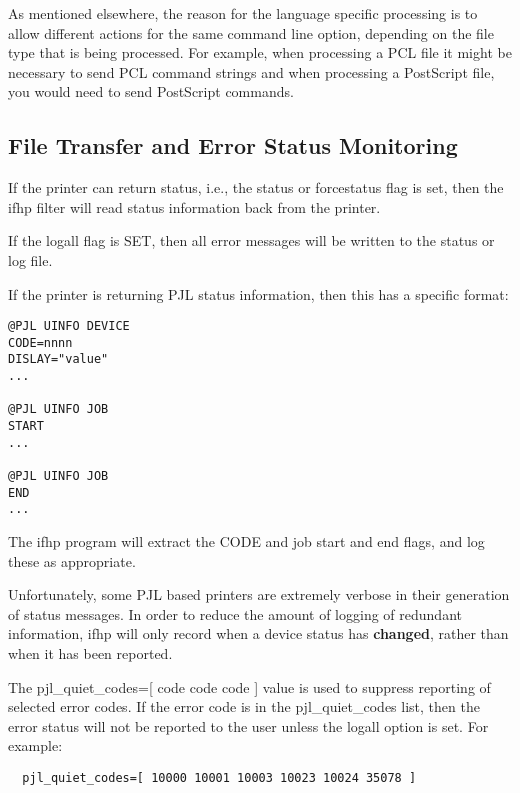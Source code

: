 \documentclass[a4paper]{article}
\begin{document}
As mentioned elsewhere,
the reason for the language specific processing is to allow
different actions for the same command line option,
depending on the file type that is being processed.
For example,  when processing a PCL file it might be necessary to send
PCL command strings and when processing a PostScript file,
you would need to send PostScript commands.


\subsection{File Transfer and Error Status Monitoring
\label{filetransfer}
\label{logall}
\label{pjl_error_codes}
\label{pjl_quiet_codes}}

If the printer can return status, i.e., the
{\ttfamily status}
or 
{\ttfamily forcestatus}
flag is set,
then the
{\ttfamily ifhp}
filter will read status information back from the printer.

If the
{\ttfamily logall}
flag is SET,
then all error messages will be written to the status or log file.

If the printer is returning PJL status information,
then this has a specific format:
\begin{tscreen}
\begin{verbatim}
@PJL UINFO DEVICE
CODE=nnnn
DISLAY="value"
...

@PJL UINFO JOB
START
...

@PJL UINFO JOB
END
...
\end{verbatim}
\end{tscreen}


The
{\ttfamily ifhp} program will extract the
{\ttfamily CODE}
and job start and end flags,
and log these as appropriate.

Unfortunately,
some PJL based printers are extremely verbose in their generation of status
messages.
In order to reduce the amount of logging of redundant information,
{\ttfamily ifhp}
will only record when a device status has
{\bfseries changed},
rather than when it has been reported.

The
pjl\_quiet\_codes={[} code code code {]}
value is used to suppress reporting of selected error codes.
If the error code is in the pjl\_quiet\_codes list,  then the error status
will not be reported to the user unless the
{\ttfamily logall}
option is set.
For example:
\begin{tscreen}
\begin{verbatim}
  pjl_quiet_codes=[ 10000 10001 10003 10023 10024 35078 ]
\end{verbatim}
\end{tscreen}
\end{document}
